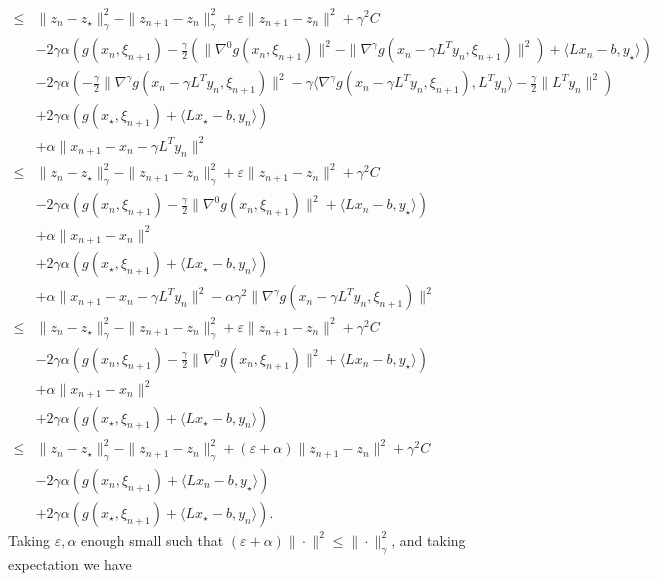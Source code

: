 \documentclass{article}
\newcommand{\1}{\mathbbm 1}
\newcommand{\ps}[1]{\langle #1 \rangle}
\theoremstyle{definition}
\begin{document}
\begin{align*}
\leq &\|z_{n} - z_\star\|_\gamma^2 - \|z_{n+1} - z_{n}\|_\gamma^2 + \varepsilon \|z_{n+1} - z_{n}\|^2 + \gamma^2 C \\
& -2\gamma\alpha \left( g(x_{n},\xi_{n+1}) - \frac{\gamma}{2}\left(\|\nabla^0 g(x_{n},\xi_{n+1})\|^2 - \|\nabla^\gamma g(x_n-\gamma L^T y_n,\xi_{n+1})\|^2\right) + \ps{L x_{n}-b,y_\star} \right)\\
&-2\gamma\alpha \left(-\frac{\gamma}{2}\|\nabla^\gamma g(x_n-\gamma L^T y_n,\xi_{n+1})\|^2 - \gamma\ps{\nabla^\gamma g(x_n-\gamma L^T y_n,\xi_{n+1}), L^T y_n} - \frac{\gamma}{2}\|L^T y_n\|^2 \right) \\
& +2\gamma \alpha\left( g(x_\star,\xi_{n+1}) + \ps{L x_\star-b,y_{n}} \right)\\
& +\alpha \|x_{n+1} - x_n - \gamma L^T y_n\|^2\\
\leq &\|z_{n} - z_\star\|_\gamma^2 - \|z_{n+1} - z_{n}\|_\gamma^2 + \varepsilon \|z_{n+1} - z_{n}\|^2 + \gamma^2 C \\
& -2\gamma\alpha \left( g(x_{n},\xi_{n+1}) - \frac{\gamma}{2}\|\nabla^0 g(x_{n},\xi_{n+1})\|^2 + \ps{L x_{n}-b,y_\star} \right)\\
& + \alpha\|x_{n+1} - x_n\|^2 \\
& +2\gamma \alpha\left( g(x_\star,\xi_{n+1}) + \ps{L x_\star-b,y_{n}} \right)\\
& + \alpha\|x_{n+1} - x_n - \gamma L^T y_n\|^2 - \alpha\gamma^2 \|\nabla^\gamma g(x_n-\gamma L^T y_n,\xi_{n+1})\|^2\\
\leq &\|z_{n} - z_\star\|_\gamma^2 - \|z_{n+1} - z_{n}\|_\gamma^2 + \varepsilon \|z_{n+1} - z_{n}\|^2 + \gamma^2 C \\
& -2\gamma\alpha \left( g(x_{n},\xi_{n+1}) - \frac{\gamma}{2}\|\nabla^0 g(x_{n},\xi_{n+1})\|^2 + \ps{L x_{n}-b,y_\star} \right)\\
& + \alpha\|x_{n+1} - x_n\|^2 \\
& +2\gamma\alpha \left( g(x_\star,\xi_{n+1}) + \ps{L x_\star-b,y_{n}} \right)\\
\leq &\|z_{n} - z_\star\|_\gamma^2 - \|z_{n+1} - z_{n}\|_\gamma^2 + (\varepsilon + \alpha) \|z_{n+1} - z_{n}\|^2 + \gamma^2 C \\
& -2\gamma\alpha \left( g(x_{n},\xi_{n+1}) + \ps{L x_{n}-b,y_\star} \right)\\
& +2\gamma\alpha \left( g(x_\star,\xi_{n+1}) + \ps{L x_\star-b,y_{n}} \right).
\end{align*}
Taking $\varepsilon, \alpha$ enough small such that $(\varepsilon + \alpha) \|\cdot\|^2 \leq \|\cdot\|_\gamma^2$, and taking expectation we have
\end{document}
